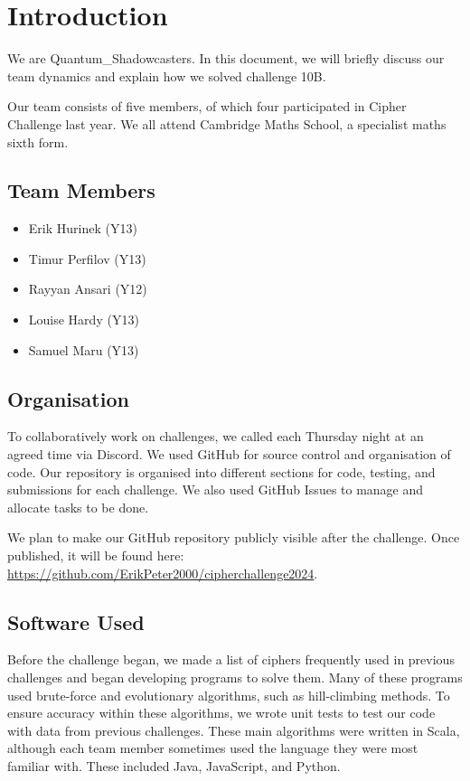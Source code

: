 
\section*{Introduction}

We are Quantum\_Shadowcasters. In this document, we will briefly discuss our team dynamics and explain how we solved challenge 10B. %

Our team consists of five members, of which four participated in Cipher Challenge last year. We all attend Cambridge Maths School, a specialist maths sixth form.

\subsection*{Team Members}

\begin{itemize}
    \item Erik Hurinek (Y13)
    \item Timur Perfilov (Y13)
    \item Rayyan Ansari (Y12)
    \item Louise Hardy (Y13)
    \item Samuel Maru (Y13)
\end{itemize}

\subsection*{Organisation}

To collaboratively work on challenges, we called each Thursday night at an agreed time via Discord. We used GitHub for source control and organisation of code. Our repository is organised into different sections for code, testing, and submissions for each challenge. We also used GitHub Issues to manage and allocate tasks to be done.

We plan to make our GitHub repository publicly visible after the challenge. Once published, it will be found here: \url{https://github.com/ErikPeter2000/cipherchallenge2024}.

\subsection*{Software Used}

Before the challenge began, we made a list of ciphers frequently used in previous challenges and began developing programs to solve them. Many of these programs used brute-force and evolutionary algorithms, such as hill-climbing methods. To ensure accuracy within these algorithms, we wrote unit tests to test our code with data from previous challenges. These main algorithms were written in Scala, although each team member sometimes used the language they were most familiar with. These included Java, JavaScript, and Python.